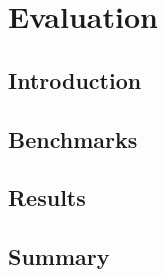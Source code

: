 \section{Evaluation}
\label{evaluation}

\subsection{Introduction}

\subsection{Benchmarks}

\subsection{Results}

\subsection{Summary}

